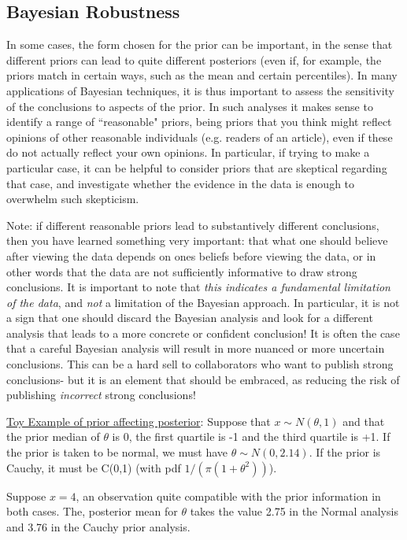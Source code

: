 \documentclass[12pt]{article}
\begin{document}
\subsection{Bayesian Robustness}

 In some cases, the form chosen for the prior can be important,
  in the sense that different priors can lead to quite different
  posteriors (even if, for example, the priors match in certain ways, such as the mean and
  certain percentiles).   In many applications of Bayesian techniques, it is thus
  important to assess the sensitivity of the conclusions to aspects of
  the prior.  In such analyses it makes sense to identify a range of ``reasonable" priors,
  being priors that you think might reflect opinions of other reasonable individuals (e.g. readers of an article), even  if these do not  actually reflect your own opinions. In particular, if trying to make
  a particular case, it can be helpful to consider priors that are skeptical regarding that
  case, and investigate whether the evidence in the data is enough to overwhelm such skepticism.
 
 Note: if different reasonable priors lead to substantively different conclusions, then
 you have learned something very important: that what one should believe after viewing
 the data depends on ones beliefs before viewing the data, or in other words that the
 data are not sufficiently informative to draw strong conclusions. It is important to note
 that {\it this indicates a fundamental limitation of the data}, and {\it not} a limitation of the Bayesian
 approach. In particular, it is not a sign that one should discard the Bayesian analysis and look
 for a different analysis that leads to a more concrete or confident conclusion! It is often
 the case that a careful Bayesian analysis will result in more nuanced or more uncertain conclusions.
 This can be a hard sell to collaborators who want to publish strong conclusions- but it is an 
 element that should be embraced, as reducing the risk of publishing {\it incorrect} strong
 conclusions!
 
\underline{Toy Example of prior affecting posterior}:  Suppose that $x\sim N(\theta,1)$ and that the
prior median of $\theta$ is 0, the first quartile is -1 and the third
quartile is +1.  If the prior is taken to be normal, we must have
$\theta \sim N(0,2.14)$.  If the prior is Cauchy, it must be C(0,1)
(with pdf $1/(\pi(1+\theta^2))$).  

Suppose $x=4$, an observation
quite compatible with the prior information in both cases.  The,
posterior mean for $\theta$ takes the value 2.75 in the Normal analysis and 3.76 in the
Cauchy prior analysis.
\end{document}
